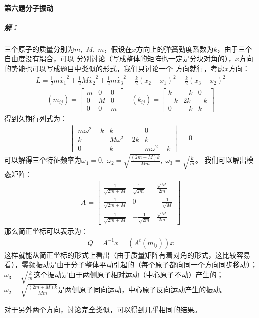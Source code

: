 \documentclass[a4paper]{ctexart}
\begin{document}
    \paragraph{第六题\;\;分子振动}
    \subparagraph{解：}
    三个原子的质量分别为$m,\;M,\;m$，假设在$x$方向上的弹簧劲度系数为$k$，由于三个自由度没有耦合，可以
    分别讨论（写成整体的矩阵也一定是分块对角的），$x$方向的势能也可以写成题目中类似的形式，我们只讨论一个
    方向就行，考虑$x$方向：
    \begin{align}
        L = \frac{1}{2}m\dot{x_{1}}^{2} + \frac{1}{2}M\dot{x_{2}}^{2} + \frac{1}{2}m\dot{x_{3}}^{2} - \frac{k}{2}(x_{2} - x_{1})^{2} - \frac{k}{2}(x_{3} - x_{2})^{2}
    \end{align}
    \begin{gather}
        (m_{ij}) = 
            \begin{bmatrix}
                m & 0 & 0\\
                0 & M & 0 \\
                0 & 0 & m
            \end{bmatrix}
            \quad
        (k_{ij}) = 
            \begin{bmatrix}
                k & -k & 0\\
                -k & 2k & -k\\
                0 & -k & k
            \end{bmatrix}
    \end{gather}
    得到久期行列式为：
    \begin{gather}
        \begin{vmatrix}
            m\omega^{2} - k & k &0\\
            k & M\omega^{2} - 2k & k\\
            0 & k & m\omega^{2} - k
        \end{vmatrix}
        =0
    \end{gather}
    可以解得三个特征频率为$\omega_{1} = 0,\;\omega_{2} = \sqrt{\frac{(2m + M)k}{Mm}},\;\omega_{3} = \sqrt{\frac{k}{m}}$。
    我们可以解出模态矩阵：
    \begin{gather}
        A = 
        \begin{bmatrix}
            \frac{1}{\sqrt{2m + M}} & \frac{1}{\sqrt{2m}} & \frac{\sqrt{M}}{2m}\\
            \frac{1}{\sqrt{2m + M}} & 0 & -\frac{1}{\sqrt{M}}\\
            \frac{1}{\sqrt{2m + M}} & -\frac{1}{\sqrt{2m}} & \frac{\sqrt{M}}{2m}
        \end{bmatrix}
    \end{gather}
    那么简正坐标可以表示为：
    \begin{align}
        Q = A^{-1}x = (A^{t}(m_{ij}))x
    \end{align}
    这样就能从简正坐标的形式上看出（由于质量矩阵有着对角的形式，这比较容易看），零频振动是由于分子整体平动引起的（每个原子都向同一个方向同步移动）；
    $\omega_{3} = \sqrt{\frac{k}{m}}$这个振动是由于两侧原子相对运动（中心原子不动）产生的；
    $\omega_{2} = \sqrt{\frac{(2m + M)k}{Mm}}$是两侧原子同向运动，中心原子反向运动产生的振动。
    \par
    对于另外两个方向，讨论完全类似，可以得到几乎相同的结果。
    \\
\end{document}
